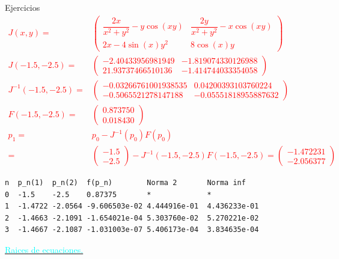 \begin{frame}[fragile]{Ejercicios}
\small
\textcolor{red}{
\begin{align*}
J(x,y)=&\begin{pmatrix}
\dfrac{2x}{x^2+y^2}-y\cos(xy) & \dfrac{2y}{x^2+y^2}-x\cos(xy)\\
2x-4\sin(x)y^2 & 8 \cos(x)y 
\end{pmatrix}\\
J(-1.5,-2.5)=&
\begin{pmatrix}
 - 2.40433956981949  & - 1.819074330126988\\
 21.93737466510136   & - 1.414744033354058
\end{pmatrix}\\
J^{-1}(-1.5,-2.5)=&
\begin{pmatrix}
-0.03266761001938535 &  0.04200393103760224\\
-0.5065521278147188 &  - 0.05551818955887632
\end{pmatrix}\\
F(-1.5,-2.5)=&
\begin{pmatrix}
0.873750\\
0.018430
\end{pmatrix}\\
p_1=&p_0-J^{-1}(p_0)F(p_0)\\
=&
\begin{pmatrix}
-1.5\\
-2.5
\end{pmatrix}
-J^{-1}(-1.5,-2.5)F(-1.5,-2.5)=
\begin{pmatrix}
-1.472231\\
-2.056377
\end{pmatrix}
\end{align*}}
\small
\begin{lstlisting}[style=mystyle,backgroundcolor=\color{gray!30}]
n  p_n(1)  p_n(2)  f(p_n)        Norma 2       Norma inf
0  -1.5    -2.5    0.87375       *             *
1  -1.4722 -2.0564 -9.606503e-02 4.444916e-01  4.436233e-01
2  -1.4663 -2.1091 -1.654021e-04 5.303760e-02  5.270221e-02
3  -1.4667 -2.1087 -1.031003e-07 5.406173e-04  3.834635e-04
\end{lstlisting}
\normalsize
\hyperlink{RetornoTeoremaRaices10}{\textcolor{cyan}{Raices de ecuaciones.}} 
\end{frame}
